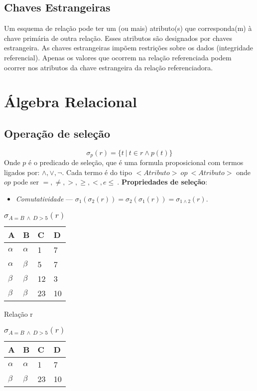 \documentclass{article}
\begin{document}
\subsection{Chaves Estrangeiras}
Um esquema de relação pode ter um (ou mais) atributo(s) que corresponda(m) à chave primária de outra relação. Esses atributos são designados por chaves estrangeira. As chaves estrangeiras impõem restrições sobre os dados (integridade referencial). Apenas os valores que ocorrem na relação referenciada podem ocorrer nos atributos da chave estrangeira da relação referenciadora.

\section{Álgebra Relacional}

\subsection{Operação de seleção}
\[
  \sigma_p(r) = \{t \ | \ t \in r \wedge p(t)\}
\]
Onde $p$ é o predicado de seleção, que é uma formula proposicional com termos ligados por: $\wedge, \vee, \neg$. Cada termo é do tipo $<Atributo> \ op \ <Atributo>$ onde $op$ pode ser $=, \neq, >, \geq ,< ,e \leq  \ $.
\textbf{Propriedades de seleção}:
\begin{itemize}
  \item \textit{Comutatividade} --- $\sigma_1(\sigma_2(r)) = \sigma_2(\sigma_1(r)) = \sigma_{1 \wedge 2}(r)$.
\end{itemize}

\begin{table}[ht]
  \parbox{.45\linewidth}{
    \centering
    \begin{tabular}{|l|l|l|l|}
      \hline
      A        & B        & C  & D  \\ \hline
      $\alpha$ & $\alpha$ & 1  & 7  \\ \hline
      $\alpha$ & $\beta$  & 5  & 7  \\ \hline
      $\beta$  & $\beta$  & 12 & 3  \\ \hline
      $\beta$  & $\beta$  & 23 & 10 \\ \hline
    \end{tabular}
    \caption{Relação r}
  }
  \hfill
  \parbox{.45\linewidth}{
    \centering
    \begin{tabular}{|l|l|l|l|}
      \hline
      A        & B        & C  & D  \\ \hline
      $\alpha$ & $\alpha$ & 1  & 7  \\ \hline
      $\beta$  & $\beta$  & 23 & 10 \\ \hline
    \end{tabular}
    \caption{$\sigma_{A=B \ \wedge \ D>5}(r)$}
  }
\end{table}
\end{document}
